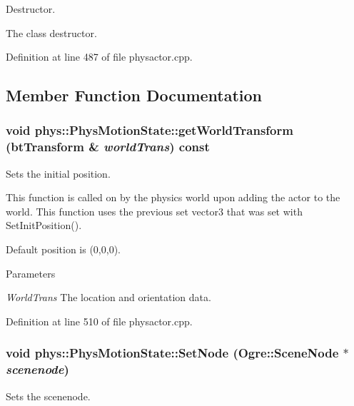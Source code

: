 Destructor. 

The class destructor. 

Definition at line 487 of file physactor.cpp.



\subsection{Member Function Documentation}
\hypertarget{classphys_1_1PhysMotionState_a80e8549fbab99150ba8f34aa3bf087d8}{
\subsubsection[{getWorldTransform}]{\setlength{\rightskip}{0pt plus 5cm}void phys::PhysMotionState::getWorldTransform (btTransform \& {\em worldTrans}) const}}
\label{dc/d0d/classphys_1_1PhysMotionState_a80e8549fbab99150ba8f34aa3bf087d8}


Sets the initial position. 

This function is called on by the physics world upon adding the actor to the world. This function uses the previous set vector3 that was set with SetInitPosition(). \par
 Default position is (0,0,0). 
\begin{DoxyParams}{Parameters}
\item[{\em WorldTrans}]The location and orientation data. \end{DoxyParams}


Definition at line 510 of file physactor.cpp.

\hypertarget{classphys_1_1PhysMotionState_a034376e768543b377430611dff323412}{
\subsubsection[{SetNode}]{\setlength{\rightskip}{0pt plus 5cm}void phys::PhysMotionState::SetNode (Ogre::SceneNode $\ast$ {\em scenenode})}}
\label{dc/d0d/classphys_1_1PhysMotionState_a034376e768543b377430611dff323412}


Sets the scenenode. 

